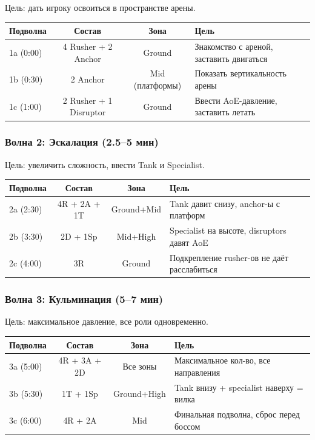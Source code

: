 \documentclass[a4paper,11pt]{report}
\begin{document}
Цель: дать игроку освоиться в пространстве арены.

\begin{table}[H]
\centering
\begin{tabularx}{\textwidth}{@{}l c c X@{}}
\toprule
\textbf{Подволна} & \textbf{Состав} & \textbf{Зона} & \textbf{Цель} \\
\midrule
1a (0:00) & 4 Rusher + 2 Anchor & Ground & Знакомство с ареной, заставить двигаться \\
1b (0:30) & 2 Anchor & Mid (платформы) & Показать вертикальность арены \\
1c (1:00) & 2 Rusher + 1 Disruptor & Ground & Ввести AoE-давление, заставить летать \\
\bottomrule
\end{tabularx}
\end{table}

\subsubsection{Волна 2: Эскалация (2.5--5 мин)}

Цель: увеличить сложность, ввести Tank и Specialist.

\begin{table}[H]
\centering
\begin{tabularx}{\textwidth}{@{}l c c X@{}}
\toprule
\textbf{Подволна} & \textbf{Состав} & \textbf{Зона} & \textbf{Цель} \\
\midrule
2a (2:30) & 4R + 2A + 1T & Ground+Mid & Tank давит снизу, anchor-ы с платформ \\
2b (3:30) & 2D + 1Sp & Mid+High & Specialist на высоте, disruptors давят AoE \\
2c (4:00) & 3R & Ground & Подкрепление rusher-ов не даёт расслабиться \\
\bottomrule
\end{tabularx}
\end{table}

\subsubsection{Волна 3: Кульминация (5--7 мин)}

Цель: максимальное давление, все роли одновременно.

\begin{table}[H]
\centering
\begin{tabularx}{\textwidth}{@{}l c c X@{}}
\toprule
\textbf{Подволна} & \textbf{Состав} & \textbf{Зона} & \textbf{Цель} \\
\midrule
3a (5:00) & 4R + 3A + 2D & Все зоны & Максимальное кол-во, все направления \\
3b (5:30) & 1T + 1Sp & Ground+High & Tank внизу + specialist наверху = вилка \\
3c (6:00) & 4R + 2A & Mid & Финальная подволна, сброс перед боссом \\
\bottomrule
\end{tabularx}
\end{table}
\end{document}
